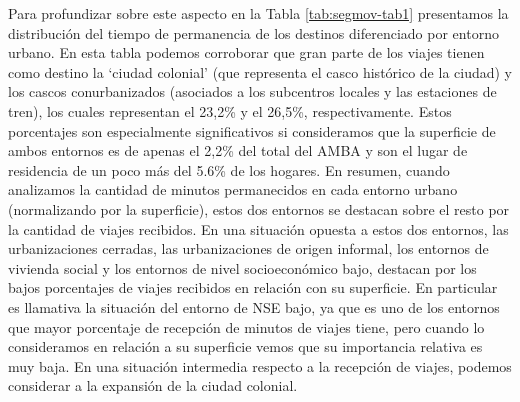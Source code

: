 \documentclass[
  spanish,
  a4paper,%
  chapterprefix=true,%
  DIV=calc,%
  twoside]{scrbook}%
\begin{document}
Para profundizar sobre este aspecto en la Tabla \ref{tab:segmov-tab1}
presentamos la distribución del tiempo de permanencia de los destinos
diferenciado por entorno urbano. En esta tabla podemos corroborar que
gran parte de los viajes tienen como destino la `ciudad colonial' (que
representa el casco histórico de la ciudad) y los cascos conurbanizados
(asociados a los subcentros locales y las estaciones de tren), los
cuales representan el
23,2\% y el
26,5\%,
respectivamente. Estos porcentajes son especialmente significativos si
consideramos que la superficie de ambos entornos es de apenas el
2,2\%
del total del AMBA y son el lugar de residencia de un poco más del 5.6\%
de los hogares. En resumen, cuando analizamos la cantidad de minutos
permanecidos en cada entorno urbano (normalizando por la superficie),
estos dos entornos se destacan sobre el resto por la cantidad de viajes
recibidos. En una situación opuesta a estos dos entornos, las
urbanizaciones cerradas, las urbanizaciones de origen informal, los
entornos de vivienda social y los entornos de nivel socioeconómico bajo,
destacan por los bajos porcentajes de viajes recibidos en relación con
su superficie. En particular es llamativa la situación del entorno de
NSE bajo, ya que es uno de los entornos que mayor porcentaje de
recepción de minutos de viajes tiene, pero cuando lo consideramos en
relación a su superficie vemos que su importancia relativa es muy baja.
En una situación intermedia respecto a la recepción de viajes, podemos
considerar a la expansión de la ciudad colonial.
\end{document}
